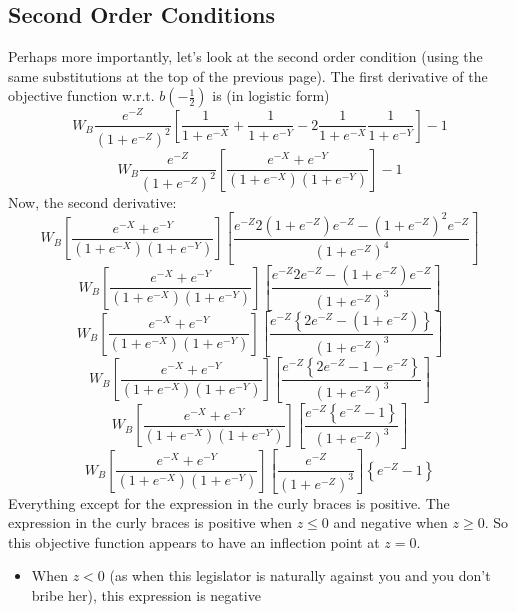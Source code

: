 \documentclass[12pt]{article}
\begin{document}
\subsection{Second Order Conditions}
Perhaps more importantly, let's look at the second order condition (using the same substitutions at the top of the previous page). The first derivative of the objective function w.r.t. $b(-\frac{1}{2})$ is (in logistic form)
\begin{equation}
  W_B\frac{e^{-Z}}{\left(1+e^{-Z}\right)^2}\left[\frac{1}{1+e^{-X}} + \frac{1}{1+e^{-Y}} - 2\frac{1}{1+e^{-X}}  \frac{1}{1+e^{-Y}} \right] - 1
\end{equation}
\begin{equation}
  W_B\frac{e^{-Z}}{\left(1+e^{-Z}\right)^2}\left[\frac{e^{-X} + e^{-Y}}{\left(1+e^{-X}\right)\left(1+e^{-Y}\right)} \right] - 1
	\label{eq:firstderiv}
\end{equation}
Now, the second derivative:
\[
  W_B\left[\frac{e^{-X} + e^{-Y}}{\left(1+e^{-X}\right)\left(1+e^{-Y}\right)} \right] \left[ \frac{e^{-Z} 2\left(1+e^{-Z}\right) e^{-Z}-\left(1+e^{-Z}\right)^2 e^{-Z}}{\left(1+e^{-Z}\right)^4} \right]
\]
\[
  W_B\left[\frac{e^{-X} + e^{-Y}}{\left(1+e^{-X}\right)\left(1+e^{-Y}\right)} \right] \left[ \frac{e^{-Z} 2 e^{-Z}-\left(1+e^{-Z}\right) e^{-Z}}{\left(1+e^{-Z}\right)^3} \right]
\]
\[
  W_B\left[\frac{e^{-X} + e^{-Y}}{\left(1+e^{-X}\right)\left(1+e^{-Y}\right)} \right] \left[ \frac{e^{-Z} \left\{2 e^{-Z}-\left(1+e^{-Z}\right) \right\}}{\left(1+e^{-Z}\right)^3} \right]
\]
\[
  W_B\left[\frac{e^{-X} + e^{-Y}}{\left(1+e^{-X}\right)\left(1+e^{-Y}\right)} \right] \left[ \frac{e^{-Z} \left\{2 e^{-Z}-1-e^{-Z} \right\}}{\left(1+e^{-Z}\right)^3} \right]
\]
\[
  W_B\left[\frac{e^{-X} + e^{-Y}}{\left(1+e^{-X}\right)\left(1+e^{-Y}\right)} \right] \left[ \frac{e^{-Z} \left\{e^{-Z}-1 \right\}}{\left(1+e^{-Z}\right)^3} \right]
\]
\[
  W_B\left[\frac{e^{-X} + e^{-Y}}{\left(1+e^{-X}\right)\left(1+e^{-Y}\right)} \right] \left[ \frac{e^{-Z}}{\left(1+e^{-Z}\right)^3} \right] \left\{e^{-Z}-1 \right\}
\]
Everything except for the expression in the curly braces is positive. The expression in the curly braces is positive when $z\leq0$ and negative when $z\geq0$. So this objective function appears to have an inflection point at $z=0$.
\begin{itemize}
	\item When $z < 0$ (as when this legislator is naturally against you and you don't bribe her), this expression is negative
\end{itemize}
\end{document}
